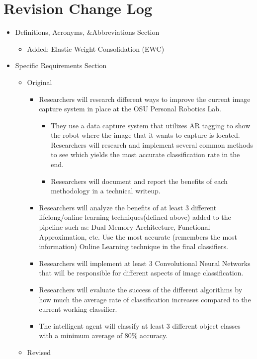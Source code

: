 \documentclass[draftclsnofoot, onecolumn, 10pt, compsoc]{IEEEtran}
\begin{document}
\newpage
\section{Revision Change Log}
	\begin{itemize}
		\item Definitions, Acronyms, \&Abbreviations Section
			\begin{itemize}
				\item Added: Elastic Weight Consolidation (EWC)
			\end{itemize}
		\item Specific Requirements Section
			\begin{itemize}
			\item Original
				\begin{itemize}
					\item Researchers will research different ways to improve the current image capture system in place at the OSU Personal Robotics Lab. 
						\begin{itemize}
							\item They use a data capture system that utilizes AR tagging to show the robot where the image that it wants to capture is located. Researchers will research and implement several common methods to see which yields the most accurate classification rate in the end. 
							\item Researchers will document and report the benefits of each methodology in a technical writeup.
						\end{itemize}
					\item Researchers will analyze the benefits of at least 3 different lifelong/online learning techniques(defined above) added to the pipeline such as: Dual Memory Architecture, Functional Approximation, etc. Use the most accurate (remembers the most information) Online Learning technique in the final classifiers.
					\item Researchers will implement at least 3 Convolutional Neural Networks that will be responsible for different aspects of image classification. 
					\item Researchers will evaluate the success of the different algorithms by how much the average rate of classification increases compared to the current working classifier.
					\item The intelligent agent will classify at least 3 different object classes with a minimum average of 80\% accuracy. 
				\end{itemize} 	
			\item Revised

\end{itemize}
\end{itemize}
\end{document}
